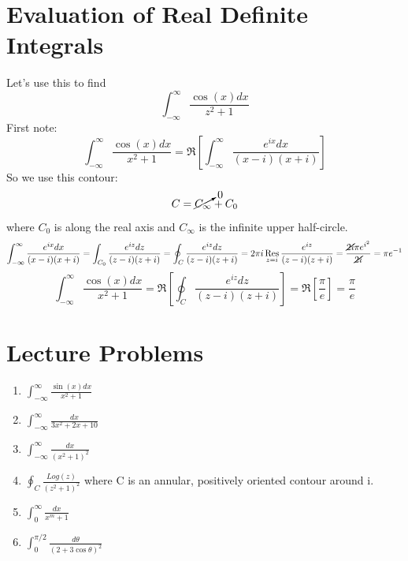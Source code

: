 \documentclass[11pt,notitlepage]{article}
\DeclareMathOperator*{\res}{Res}
\begin{document}
\section{Evaluation of Real Definite Integrals}
Let's use this to find $$\int_{-\infty}^{\infty} \frac{\cos(x)dx}{z^2+1}$$
First note: $$\int_{-\infty}^{\infty} \frac{\cos(x)dx}{x^2+1} = \Re\left[\int_{-\infty}^{\infty} \frac{e^{ix}dx}{(x-i)(x+i)}\right]$$
So we use this contour: $$C = \cancelto0{C_\infty} + C_0$$ where $C_0$ is along the real axis and $C_\infty$ is the infinite upper half-circle.
$$ \int_{-\infty}^{\infty} \frac{e^{ix}dx}{(x-i)(x+i)} = \int_{C_0} \frac{e^{iz}dz}{(z-i)(z+i)} = \oint_C \frac{e^{iz}dz}{(z-i)(z+i)} = 2\pi i\res_{z=i}\frac{e^{iz}}{(z-i)(z+i)} = \frac{\cancel{2i}\pi e^{i^2}}{\cancel{2i}}=\pi e^{-1}$$
$$ \int_{-\infty}^{\infty} \frac{\cos(x)dx}{x^2+1} =\Re\left[\oint_C \frac{e^{iz}dz}{(z-i)(z+i)}\right] =\Re\left[\frac\pi e\right] =\frac\pi e$$
\section{Lecture Problems}
\begin{enumerate}
\item $\int_{-\infty}^{\infty} \frac{\sin(x)dx}{x^2+1}$
\item $\int_{-\infty}^{\infty} \frac{dx}{3x^2+2x+10}$
\item $\int_{-\infty}^{\infty} \frac{dx}{(x^2+1)^2}$
\item $\oint_C \frac{Log(z)}{(z^2+1)^2}$ where C is an annular, positively oriented contour around i.
\item $\int_{0}^{\infty} \frac{dx}{x^m+1}$
\item $\int_0^{\pi/2}\frac{d\theta}{(2+3\cos{\theta})^2}$
\end{enumerate}
\end{document}
